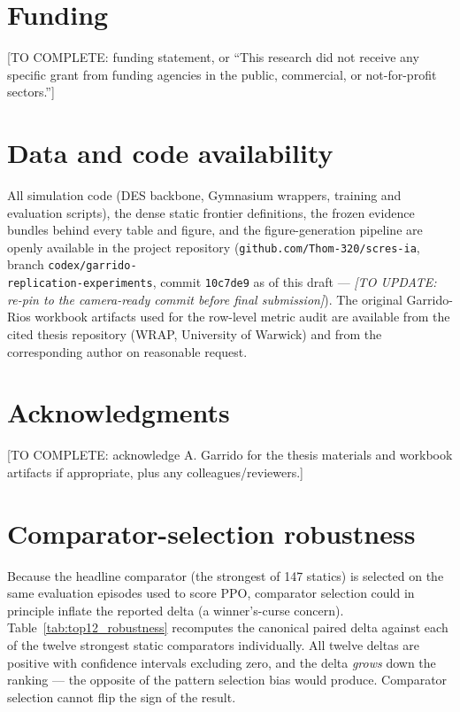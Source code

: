 \documentclass[preprint,12pt]{elsarticle}
\begin{document}
\section*{Funding}
[TO COMPLETE: funding statement, or ``This research did not receive any
specific grant from funding agencies in the public, commercial, or
not-for-profit sectors.'']

\section*{Data and code availability}
All simulation code (DES backbone, Gymnasium wrappers, training and
evaluation scripts), the dense static frontier definitions, the frozen
evidence bundles behind every table and figure, and the figure-generation
pipeline are openly available in the project repository
(\texttt{github.com/Thom-320/scres-ia}, branch
\texttt{codex/garrido-}\\\texttt{replication-experiments}, commit
\texttt{10c7de9} as of this draft --- \emph{[TO UPDATE: re-pin to the
camera-ready commit before final submission]}). The original
Garrido-Rios workbook artifacts used for the row-level metric audit are
available from the cited thesis repository (WRAP, University of Warwick)
and from the corresponding author on reasonable request.

\section*{Acknowledgments}
[TO COMPLETE: acknowledge A. Garrido for the thesis materials and
workbook artifacts if appropriate, plus any colleagues/reviewers.]

\appendix

\section{Comparator-selection robustness}\label{appendix-robustness}

Because the headline comparator (the strongest of 147 statics) is
selected on the same evaluation episodes used to score PPO, comparator
selection could in principle inflate the reported delta (a
winner's-curse concern). Table~\ref{tab:top12_robustness} recomputes the
canonical paired delta against each of the twelve strongest static
comparators individually. All twelve deltas are positive with confidence
intervals excluding zero, and the delta \emph{grows} down the ranking ---
the opposite of the pattern selection bias would produce. Comparator
selection cannot flip the sign of the result.
\end{document}
